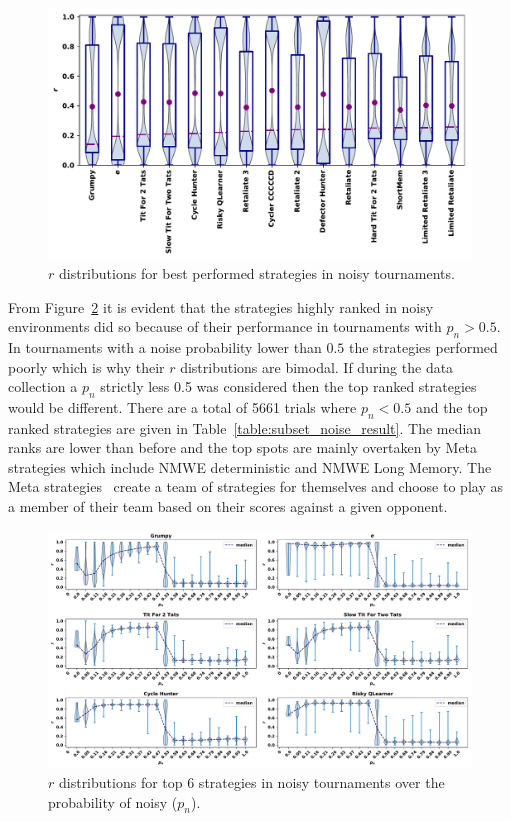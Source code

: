 \documentclass{article}
\begin{document}
\begin{figure}[!htbp]
    \centering
    \includegraphics[width=.7\textwidth]{../images/performance_noise.pdf}
    \caption{\(r\) distributions for best performed strategies in noisy tournaments.}
    \label{fig:noisy_results}
\end{figure}

From Figure~\ref{fig:effect_of_noise} it is evident that the strategies highly
ranked in noisy environments did so because of their performance in tournaments
with \(p_n>0.5\). In tournaments with a noise probability lower than \(0.5\) the
strategies performed poorly which is why their \(r\) distributions are bimodal.
If during the data collection a \(p_n\) strictly less 0.5 was considered then the top ranked strategies would be
different. There are a total of 5661 trials where \(p_n<0.5\) and the top ranked
strategies are given in Table~\ref{table:subset_noise_result}. The median ranks
are lower than before and the top spots are mainly overtaken by Meta strategies
which include NMWE deterministic and NMWE Long Memory. The Meta
strategies~\cite{axelrodproject} create a team of strategies for themselves and
choose to play as a member of their team based on their scores against a given
opponent.

\begin{figure}[!htbp]
    \centering
    \includegraphics[width=\textwidth]{../images/noise_effect.pdf}
    \caption{\(r\) distributions for top 6 strategies in noisy tournaments over
    the probability of noisy ($p_n$).}
    \label{fig:effect_of_noise}
\end{figure}
\end{document}
